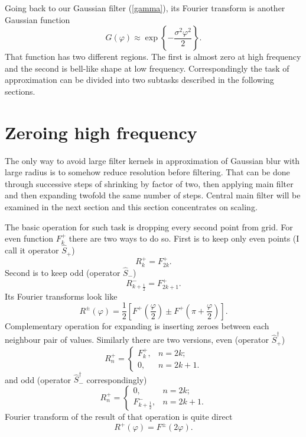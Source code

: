 \documentclass[10pt]{article}
\begin{document}
Going back to our Gaussian filter (\ref{gamma}), its Fourier transform is another Gaussian function
\begin{equation}\label{gauss}
    G(\varphi) \approx \exp\left\{-\frac{\sigma^2\varphi^2}2\right\}.
\end{equation}
That function has two different regions. The first is almost zero at high frequency and the second
is bell-like shape at low frequency. Correspondingly the task of approximation can be divided into
two subtasks described in the following sections.


\section{Zeroing high frequency}

The only way to avoid large filter kernels in approximation of Gaussian blur with large radius is to
somehow reduce resolution before filtering. That can be done through successive steps of shrinking by
factor of two, then applying main filter and then expanding twofold the same number of steps.
Central main filter will be examined in the next section and this section concentrates on scaling.

The basic operation for such task is dropping every second point from grid. For even function
$F^+_k$ there are two ways to do so. First is to keep only even points (I call it operator
$\hat S_+$)
\begin{equation}
    R^+_k = F^+_{2k}.
\end{equation}
Second is to keep odd (operator $\hat S_-$)
\begin{equation}
    R^-_{k+\frac12} = F^+_{2k+1}.
\end{equation}
Its Fourier transforms look like
\begin{equation}\label{S}
    R^\pm(\varphi) =
        \frac12 \left[F^+\left(\frac\varphi2\right) \pm F^+\left(\pi+\frac\varphi2\right)\right].
\end{equation}
Complementary operation for expanding is inserting zeroes between each neighbour pair of values.
Similarly there are two versions, even (operator $\hat S^\dagger_+$)
\begin{equation}
    R^+_n = \left\{
        \begin{array}{ll}
            F^+_k,& n = 2k;\\
            0,& n = 2k + 1.
        \end{array}
    \right.
\end{equation}
and odd (operator $\hat S^\dagger_-$ correspondingly)
\begin{equation}
    R^+_n = \left\{
        \begin{array}{ll}
            0,& n = 2k;\\
            F^-_{k+\frac12},& n = 2k + 1.
        \end{array}
    \right.
\end{equation}
Fourier transform of the result of that operation is quite direct
\begin{equation}
    R^+(\varphi) = F^\pm(2\varphi).
\end{equation}
\end{document}
